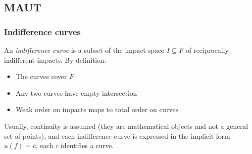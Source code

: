 \subsection{MAUT}

\subsubsection{Indifference curves}

An \textit{indifference curve} is a subset of the impact space $I \subseteq F$ of reciprocally indifferent impacts. By definition: 
\begin{itemize}
	\item The curves cover $F$
	
	\item Any two curves have empty intersection
	
	\item Weak order on impacts maps to total order on curves
\end{itemize}

Usually, continuity is assumed (they are mathematical objects and not a general set of points), and each indifference curve is expressed in the implicit form $ u(f) = c$, each $c$ identifies a curve.

